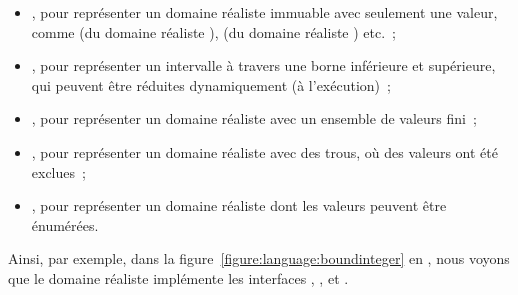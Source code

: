 \begin{itemize}

\item {}, pour représenter un domaine réaliste immuable avec
seulement une valeur, comme  (du domaine réaliste ),
 (du domaine réaliste ) etc.~;

\item {}, pour représenter un intervalle à travers une borne
inférieure et supérieure, qui peuvent être réduites dynamiquement (à
l'exécution)~;

\item {}, pour représenter un domaine réaliste avec un ensemble de
valeurs fini~;

\item {}, pour représenter un domaine réaliste avec des trous, \ie
où des valeurs ont été exclues~;

\item {}, pour représenter un domaine réaliste dont les valeurs
peuvent être énumérées.

\end{itemize}

Ainsi, par exemple, dans la figure~\ref{figure:language:boundinteger} en
, nous voyons que le domaine réaliste  implémente
les interfaces , ,  et
.
